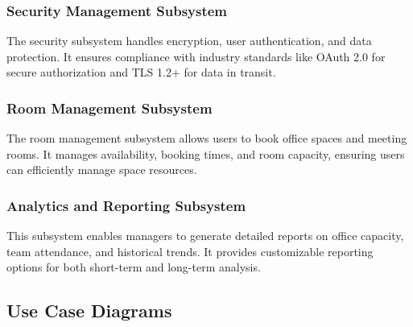 \documentclass[11pt,a4paper]{article}
\begin{document}
\subsubsection*{Security Management Subsystem}
The security subsystem handles encryption, user authentication, and data protection. It ensures compliance with industry standards like OAuth 2.0 for secure authorization and TLS 1.2+ for data in transit.

\subsubsection*{Room Management Subsystem}
The room management subsystem allows users to book office spaces and meeting rooms. It manages availability, booking times, and room capacity, ensuring users can efficiently manage space resources.

\subsubsection*{Analytics and Reporting Subsystem}
This subsystem enables managers to generate detailed reports on office capacity, team attendance, and historical trends. It provides customizable reporting options for both short-term and long-term analysis.

\pagebreak


\subsection*{Use Case Diagrams}

\end{document}
